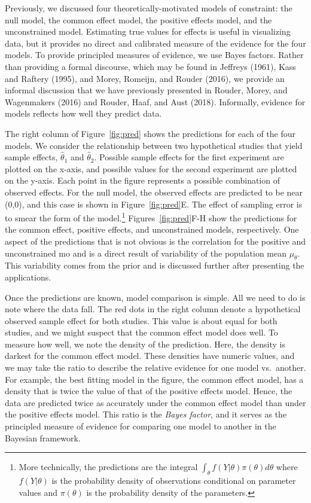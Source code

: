 \documentclass[english,man]{apa6}
\theoremstyle{definition}
\theoremstyle{definition}
\theoremstyle{definition}
\theoremstyle{remark}
\begin{document}
Previously, we discussed four theoretically-motivated models of
constraint: the null model, the common effect model, the positive
effects model, and the unconstrained model. Estimating true values for
effects is useful in visualizing data, but it provides no direct and
calibrated measure of the evidence for the four models. To provide
principled measures of evidence, we use Bayes factors. Rather than
providing a formal discourse, which may be found in Jeffreys (1961),
Kass and Raftery (1995), and Morey, Romeijn, and Rouder (2016), we
provide an informal discussion that we have previously presented in
Rouder, Morey, and Wagenmakers (2016) and Rouder, Haaf, and Aust (2018).
Informally, evidence for models reflects how well they predict data.

The right column of Figure~\ref{fig:pred} shows the predictions for each
of the four models. We consider the relationship between two
hypothetical studies that yield sample effects, \(\hat{\theta}_1\) and
\(\hat{\theta}_2\). Possible sample effects for the first experiment are
plotted on the x-axis, and possible values for the second experiment are
plotted on the y-axis. Each point in the figure represents a possible
combination of observed effects. For the null model, the observed
effects are predicted to be near (0,0), and this case is shown in
Figure~\ref{fig:pred}E. The effect of sampling error is to smear the
form of the model.\footnote{More technically, the predictions are the
  integral \(\int_\theta f(Y|\theta)\pi(\theta)d\theta\) where
  \(f(Y|\theta)\) is the probability density of observations conditional
  on parameter values and \(\pi(\theta)\) is the probability density of
  the parameters.} Figures~\ref{fig:pred}F-H show the predictions for
the common effect, positive effects, and unconstrained models,
respectively. One aspect of the predictions that is not obvious is the
correlation for the positive and unconstrained mo and is a direct result
of variability of the population mean \(\mu_\theta\). This variability
comes from the prior and is discussed further after presenting the
applications.

Once the predictions are known, model comparison is simple. All we need
to do is note where the data fall. The red dots in the right column
denote a hypothetical observed sample effect for both studies. This
value is about equal for both studies, and we might suspect that the
common effect model does well. To measure how well, we note the density
of the prediction. Here, the density is darkest for the common effect
model. These densities have numeric values, and we may take the ratio to
describe the relative evidence for one model vs.~another. For example,
the best fitting model in the figure, the common effect model, has a
density that is twice the value of that of the positive effects model.
Hence, the data are predicted twice as accurately under the common
effect model than under the positive effects model. This ratio is the
\emph{Bayes factor}, and it serves as the principled measure of evidence
for comparing one model to another in the Bayesian framework.
\end{document}
